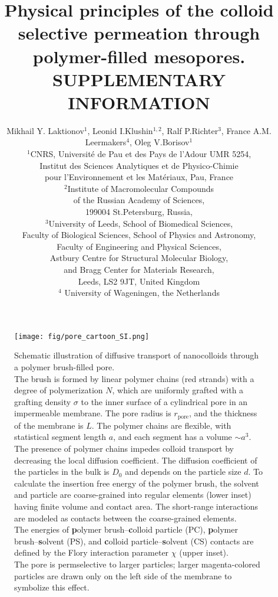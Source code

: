 \documentclass[10pt, a4paper]{article}
\title{Physical principles of the colloid selective permeation through polymer-filled mesopores.\\
        SUPPLEMENTARY INFORMATION}
\author{Mikhail Y. Laktionov$^1$, Leonid I.Klushin$^{1,2}$, Ralf P.Richter$^3$, France A.M. Leermakers$^4$, Oleg V.Borisov$^1$\\
$^{1}$CNRS, Universit\'e de Pau et des Pays de l'Adour UMR 5254,\\
Institut des Sciences Analytiques et de Physico-Chimie\\
pour l'Environnement et les Mat\'eriaux, Pau, France \\
$^{2}$Institute of Macromolecular Compounds \\
of the Russian Academy of Sciences, \\
199004 St.Petersburg, Russia,\\
$^{3}$University of Leeds, School of Biomedical Sciences, \\
Faculty of Biological Sciences, 
School of Physics and Astronomy, \\
Faculty of Engineering and Physical Sciences,\\  
Astbury Centre for Structural Molecular Biology,\\ 
and Bragg Center for Materials Research,\\ 
Leeds, LS2 9JT, United Kingdom\\
$^{4}$ University of Wageningen, the Netherlands}
\begin{document}
\maketitle

\pagebreak

\begin{figure*}[htp!]
    \centering
    \texttt{[image: fig/pore\_cartoon\_SI.png]}
    \caption{
        Schematic illustration of diffusive transport of nanocolloids through a polymer brush-filled pore.
        \\
        The brush is formed by linear polymer chains (red strands) with a degree of polymerization $N$, which are uniformly grafted with a grafting density $\sigma$ to the inner surface of a cylindrical pore in an impermeable membrane.
        The pore radius is $r_\text{pore}$, and the thickness of the membrane is $L$.
        The polymer chains are flexible, with statistical segment length $a$, and each segment has a volume $\sim a^3$.
        \\
        The presence of polymer chains impedes colloid transport by decreasing the local diffusion coefficient.
        The diffusion coefficient of the particles in the bulk is $D_0$ and depends on the particle size $d$.
        To calculate the insertion free energy of the polymer brush, the solvent and particle are coarse-grained into regular elements (lower inset) having finite volume and contact area.
        The short-range interactions are modeled as contacts between the coarse-grained elements.
        \\
        The energies of 
        \textbf{p}olymer brush–\textbf{c}olloid particle (PC), 
        \textbf{p}olymer brush–\textbf{s}olvent (PS),  
        and \textbf{c}olloid particle–\textbf{s}olvent (CS) contacts are defined by the Flory interaction parameter $\chi$ (upper inset).
        \\
        The pore is permselective to larger particles; larger magenta-colored particles are drawn only on the left side of the membrane to symbolize this effect.
    }
        \label{fig:colloid_transport_SI}
\end{figure*}

\end{document}
